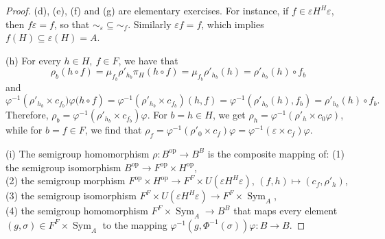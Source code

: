 \documentclass[11pt]{amsart}
\DeclareMathOperator{\op}{op}
\newcommand{\Sym}{\operatorname{Sym}}
\theoremstyle{definition}
\begin{document}
\begin{proof}
       (d), (e), (f) and (g)  are elementary exercises. For instance, if $f\in \varepsilon H^H\varepsilon$, then $f\varepsilon=f$, so that $\sim_\varepsilon\subseteq\sim_f$. Similarly $\varepsilon f=f$, which implies $f(H)\subseteq\varepsilon(H)=A$.
       
       (h)  For every $h\in H,\ f\in F$, we have that $$\rho_b(h\circ f)=\mu_{f_b} \rho'_{h_b}\pi_H(h\circ f)=\mu_{f_b} \rho'_{h_b}(h)=\rho'_{h_b}(h)\circ f_b$$ and $$\varphi^{-1}\left(\rho'_{h_b}\times c_{f_b})\varphi(h\circ f\right)=\varphi^{-1}\left(\rho'_{h_b}\times c_{f_b}\right)(h,f)= \varphi^{-1}\left(\rho'_{h_b}(h),f_b\right)=\rho'_{h_b}(h)\circ f_b.$$ Therefore, $\rho_b=\varphi^{-1}\left(\rho'_{h_b}\times c_{f_b}\right)\varphi$. For $b=h\in H$, we get $\rho_h=\varphi^{-1}\left(\rho'_{h}\times c_0\varphi\right)$, while for $b=f\in F$, we find that $\rho_f=\varphi^{-1}\left(\rho'_0\times c_{f}\right)\varphi=\varphi^{-1}\left(\varepsilon\times c_{f}\right)\varphi$.
           
           (i) The semigroup homomorphism $\rho\colon B^{\op}\to B^B$ is the composite mapping of:
           (1) the semigroup isomorphism $B^{\op}\to F^{\op}\times H^{\op}$,\\
           (2) the semigroup morphism $F^{\op}\times H^{\op}\to F^F\times U\left(\varepsilon H^H\varepsilon\right)$, $(f,h)\mapsto \left(c_f,\rho'_h\right)$,\\  
           (3) the semigroup isomorphism $F^F\times U\left(\varepsilon H^H\varepsilon\right)\to F^F\times \Sym_A$, \\
           (4) the semigroup homomorphism $F^F\times \Sym_A\to B^B$ that maps every element $(g, \sigma)\in F^F\times \Sym_A$ to the mapping $\varphi^{-1}\left(g,\Phi^{-1}(\sigma)\right)\varphi\colon B\to B$.
 \end{proof}

 


\smallskip
\end{document}
